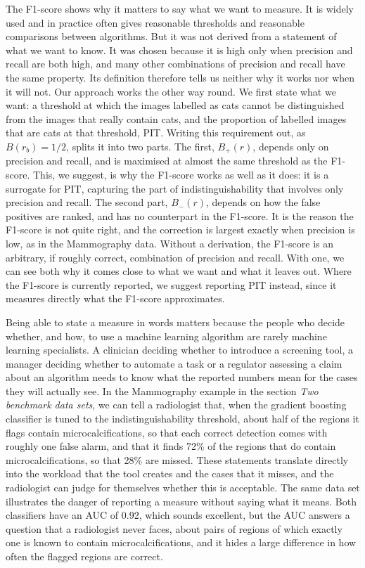 \documentclass[preprint,12pt]{article}
\begin{document}
The F1-score shows why it matters to say what we want to measure. It is widely used and in practice often gives reasonable thresholds and reasonable comparisons between algorithms. But it was not derived from a statement of what we want to know. It was chosen because it is high only when precision and recall are both high, and many other combinations of precision and recall have the same property. Its definition therefore tells us neither why it works nor when it will not. Our approach works the other way round. We first state what we want: a threshold at which the images labelled as cats cannot be distinguished from the images that really contain cats, and the proportion of labelled images that are cats at that threshold, PIT. Writing this requirement out, as $B(r_b)=1/2$, splits it into two parts. The first, $B_+(r)$, depends only on precision and recall, and is maximised at almost the same threshold as the F1-score. This, we suggest, is why the F1-score works as well as it does: it is a surrogate for PIT, capturing the part of indistinguishability that involves only precision and recall. The second part, $B_-(r)$, depends on how the false positives are ranked, and has no counterpart in the F1-score. It is the reason the F1-score is not quite right, and the correction is largest exactly when precision is low, as in the Mammography data. Without a derivation, the F1-score is an arbitrary, if roughly correct, combination of precision and recall. With one, we can see both why it comes close to what we want and what it leaves out. Where the F1-score is currently reported, we suggest reporting PIT instead, since it measures directly what the F1-score approximates.

Being able to state a measure in words matters because the people who decide whether, and how, to use a machine learning algorithm are rarely machine learning specialists. A clinician deciding whether to introduce a screening tool, a manager deciding whether to automate a task or a regulator assessing a claim about an algorithm needs to know what the reported numbers mean for the cases they will actually see. In the Mammography example in the section {\it Two benchmark data sets}, we can tell a radiologist that, when the gradient boosting classifier is tuned to the indistinguishability threshold, about half of the regions it flags contain microcalcifications, so that each correct detection comes with roughly one false alarm, and that it finds 72\% of the regions that do contain microcalcifications, so that 28\% are missed. These statements translate directly into the workload that the tool creates and the cases that it misses, and the radiologist can judge for themselves whether this is acceptable. The same data set illustrates the danger of reporting a measure without saying what it means. Both classifiers have an AUC of 0.92, which sounds excellent, but the AUC answers a question that a radiologist never faces, about pairs of regions of which exactly one is known to contain microcalcifications, and it hides a large difference in how often the flagged regions are correct.
\end{document}
